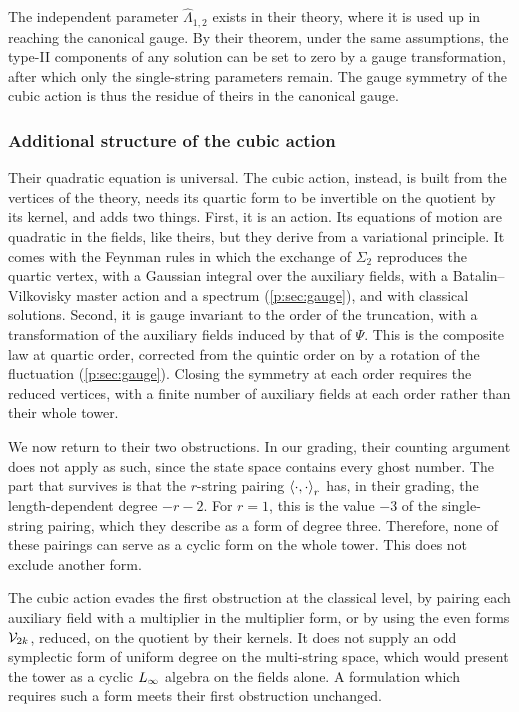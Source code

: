 The independent parameter $\hat\Lambda_{1, 2}$ exists in their theory, where it is used up in reaching the canonical gauge.
By their theorem, under the same assumptions, the type-II components of any solution can be set to zero by a gauge transformation, after which only the single-string parameters remain.
The gauge symmetry of the cubic action is thus the residue of theirs in the canonical gauge.

\subsubsection{Additional structure of the cubic action}
\label{p:sec:barcobar:structure}

Their quadratic equation is universal. The cubic action, instead, is built from the vertices of the theory, needs its quartic form to be invertible on the quotient by its kernel, and adds two things.
First, it is an action. Its equations of motion are quadratic in the fields, like theirs, but they derive from a variational principle.
It comes with the Feynman rules in which the exchange of $\Sigma_2$ reproduces the quartic vertex, with a Gaussian integral over the auxiliary fields, with a Batalin--Vilkovisky master action and a spectrum (\cref{p:sec:gauge}), and with classical solutions.
Second, it is gauge invariant to the order of the truncation, with a transformation of the auxiliary fields induced by that of $\Psi$.
This is the composite law at quartic order, corrected from the quintic order on by a rotation of the fluctuation (\cref{p:sec:gauge}).
Closing the symmetry at each order requires the reduced vertices, with a finite number of auxiliary fields at each order rather than their whole tower.

We now return to their two obstructions.
In our grading, their counting argument does not apply as such, since the state space contains every ghost number.
The part that survives is that the $r$-string pairing $\pair[r]{\cdot}{\cdot}$ has, in their grading, the length-dependent degree $- r - 2$. For $r = 1$, this is the value $- 3$ of the single-string pairing, which they describe as a form of degree three.
Therefore, none of these pairings can serve as a cyclic form on the whole tower. This does not exclude another form.

The cubic action evades the first obstruction at the classical level, by pairing each auxiliary field with a multiplier in the multiplier form, or by using the even forms $\vertex{2k}$, reduced, on the quotient by their kernels.
It does not supply an odd symplectic form of uniform degree on the multi-string space, which would present the tower as a cyclic $\Loo$ algebra on the fields alone. A formulation which requires such a form meets their first obstruction unchanged.

